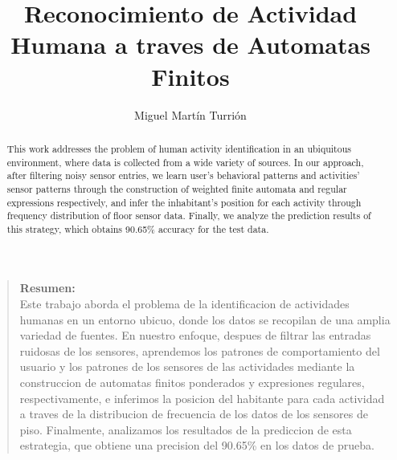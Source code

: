 \documentclass[]{article}
\title{Reconocimiento de Actividad Humana a traves de Automatas Finitos}
\author{Miguel Martín Turrión}
\newenvironment{resumen}{
	\begin{quote}
		\textbf{Resumen:} \\
	}{
	\end{quote}
}
\begin{document}
\maketitle

\begin{resumen}
Este trabajo aborda el problema de la identificacion de actividades humanas en un entorno ubicuo, donde los datos se recopilan de una amplia variedad de fuentes. En nuestro enfoque, despues de filtrar las entradas ruidosas de los sensores, aprendemos los patrones de comportamiento del usuario y los patrones de los sensores de las actividades mediante la construccion de automatas finitos ponderados y expresiones regulares, respectivamente, e inferimos la posicion del habitante para cada actividad a traves de la distribucion de frecuencia de los datos de los sensores de piso. Finalmente, analizamos los resultados de la prediccion de esta estrategia, que obtiene una precision del 90.65\% en los datos de prueba.
\end{resumen}

\begin{abstract}
This work addresses the problem of human activity identification in an ubiquitous
environment, where data is collected from a wide variety of sources. In our approach, after filtering
noisy sensor entries, we learn user’s behavioral patterns and activities’ sensor patterns through
the construction of weighted finite automata and regular expressions respectively, and infer the
inhabitant’s position for each activity through frequency distribution of floor sensor data. Finally, we
analyze the prediction results of this strategy, which obtains 90.65\% accuracy for the test data.
\end{abstract}

\section{}
\end{document}
